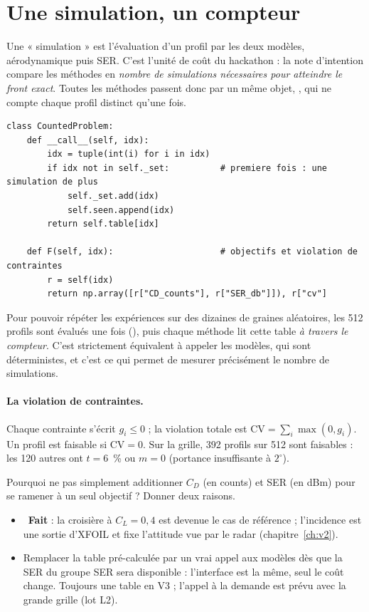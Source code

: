 \section{Une simulation, un compteur}
Une « simulation » est l'évaluation d'un profil par les deux modèles, aérodynamique puis SER. C'est l'unité de coût du hackathon : la note d'intention compare les méthodes en \emph{nombre de simulations nécessaires pour atteindre le front exact}. Toutes les méthodes passent donc par un même objet, , qui ne compte chaque profil distinct qu'une fois.

\begin{codebox}
\begin{lstlisting}
class CountedProblem:
    def __call__(self, idx):
        idx = tuple(int(i) for i in idx)
        if idx not in self._set:          # premiere fois : une simulation de plus
            self._set.add(idx)
            self.seen.append(idx)
        return self.table[idx]

    def F(self, idx):                     # objectifs et violation de contraintes
        r = self(idx)
        return np.array([r["CD_counts"], r["SER_db"]]), r["cv"]
\end{lstlisting}
Pour pouvoir répéter les expériences sur des dizaines de graines aléatoires, les 512 profils sont évalués une fois (), puis chaque méthode lit cette table \emph{à travers le compteur}. C'est strictement équivalent à appeler les modèles, qui sont déterministes, et c'est ce qui permet de mesurer précisément le nombre de simulations.
\end{codebox}

\paragraph{La violation de contraintes.} Chaque contrainte s'écrit $g_i\le0$ ; la violation totale est $\mathrm{CV}=\sum_i\max(0,g_i)$. Un profil est faisable si $\mathrm{CV}=0$. Sur la grille, 392 profils sur 512 sont faisables : les 120 autres ont $t=6$~\% ou $m=0$ (portance insuffisante à $2^\circ$).

\exercices
\begin{exercice}
Pourquoi ne pas simplement additionner $C_D$ (en counts) et SER (en dBm) pour se ramener à un seul objectif ? Donner deux raisons.
\end{exercice}

\begin{pistes}
\begin{itemize}
\item {}~\textbf{Fait} : la croisière à $C_L=0{,}4$ est devenue le cas de référence ; l'incidence est une sortie d'XFOIL et fixe l'attitude vue par le radar (chapitre~\ref{ch:v2}).
\item Remplacer la table pré-calculée par un vrai appel aux modèles dès que la SER du groupe SER sera disponible : l'interface est la même, seul le coût change. Toujours une table en V3 ; l'appel à la demande est prévu avec la grande grille (lot L2).
\end{itemize}
\end{pistes}

